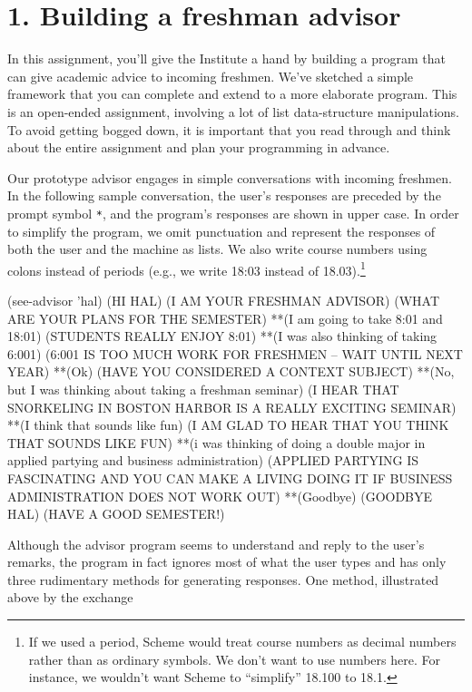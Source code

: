 
\setcounter{page}{3}


\section{1. Building a freshman advisor}

In this assignment, you'll give the Institute a hand by building a
program that can give academic advice to incoming freshmen.  We've
sketched a simple framework that you can complete and extend to a more
elaborate program.  This is an open-ended assignment, involving a lot
of list data-structure manipulations.  To avoid getting bogged down,
it is important that you read through and think about the entire
assignment and plan your programming in advance.

Our prototype advisor engages in simple conversations with incoming
freshmen.  In the following sample conversation, the user's responses
are preceded by the prompt symbol {\tt **}, and the program's
responses are shown in upper case.  In order to simplify the program,
we omit punctuation and represent the responses of both the user and
the machine as lists.  We also write course numbers using colons
instead of periods (e.g., we write 18:03 instead of
18.03).\footnote{If we used a period, Scheme would treat course
numbers as decimal numbers rather than as ordinary symbols.  We don't
want to use numbers here.  For instance, we wouldn't want Scheme to
``simplify'' 18.100 to 18.1.}

\beginlisp
(see-advisor 'hal)
(HI HAL)
(I AM YOUR FRESHMAN ADVISOR)
(WHAT ARE YOUR PLANS FOR THE SEMESTER)
**(I am going to take 8:01 and 18:01)
(STUDENTS REALLY ENJOY 8:01)
**(I was also thinking of taking 6:001)
(6:001 IS TOO MUCH WORK FOR FRESHMEN -- WAIT UNTIL NEXT YEAR)
**(Ok)
(HAVE YOU CONSIDERED A CONTEXT SUBJECT)
**(No, but I was thinking about taking a freshman seminar)
(I HEAR THAT SNORKELING IN BOSTON HARBOR IS A REALLY EXCITING SEMINAR)
**(I think that sounds like fun)
(I AM GLAD TO HEAR THAT YOU THINK THAT SOUNDS LIKE FUN)
**(i was thinking of doing a double major in
   applied partying and business administration)
(APPLIED PARTYING IS FASCINATING AND YOU CAN MAKE A LIVING DOING IT
   IF BUSINESS ADMINISTRATION DOES NOT WORK OUT)
**(Goodbye)
(GOODBYE HAL)
(HAVE A GOOD SEMESTER!)
\endlisp

Although the advisor program seems to understand and reply to the
user's remarks, the program in fact ignores most of what the user
types and has only three rudimentary methods for generating responses.
One method, illustrated above by the exchange

